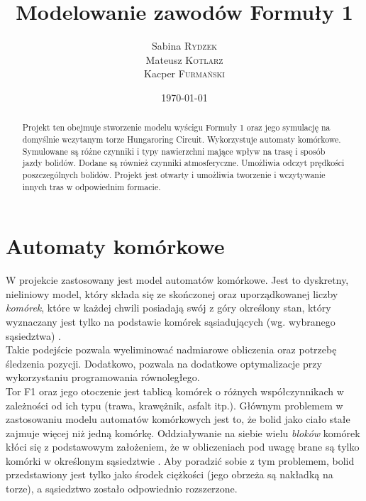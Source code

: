 \documentclass{article}
\title{Modelowanie zawodów Formuły 1} %
\author{Sabina \textsc{Rydzek} \\ Mateusz \textsc{Kotlarz} \\ Kacper \textsc{Furmański}} %
\date{\today} %
\begin{document}
\maketitle %


\begin{abstract}
Projekt ten obejmuje stworzenie modelu wyścigu Formuły 1 oraz jego symulację na domyślnie wczytanym torze Hungaroring Circuit. Wykorzystuje automaty komórkowe. Symulowane są różne czynniki i typy nawierzchni mające wpływ na trasę i sposób jazdy bolidów. Dodane są również czynniki atmosferyczne. Umożliwia odczyt prędkości poszczególnych bolidów. Projekt jest otwarty i umożliwia tworzenie i wczytywanie innych tras w odpowiednim formacie.
\end{abstract}


\section{Automaty komórkowe}

W projekcie zastosowany jest model automatów komórkowe. Jest to dyskretny, nieliniowy model, który składa się ze skończonej oraz uporządkowanej liczby \textit{komórek}, które w każdej chwili posiadają swój z góry określony stan, który wyznaczany jest tylko na podstawie komórek sąsiadujących (wg. wybranego sąsiedztwa) \cite{cellularAutomata}. \\

Takie podejście pozwala wyeliminować nadmiarowe obliczenia oraz potrzebę śledzenia pozycji. Dodatkowo, pozwala na dodatkowe optymalizacje przy wykorzystaniu programowania równoległego. \\

Tor F1 oraz jego otoczenie jest tablicą komórek o różnych współczynnikach w zależności od ich typu (trawa, krawężnik, asfalt itp.). Głównym problemem w zastosowaniu modelu automatów komórkowych jest to, że bolid jako ciało stałe zajmuje więcej niż jedną komórkę. Oddziaływanie na siebie wielu \textit{bloków} komórek kłóci się z podstawowym założeniem, że w obliczeniach pod uwagę brane są tylko komórki w określonym sąsiedztwie \cite{particleSimulation}. Aby poradzić sobie z tym problemem, bolid przedstawiony jest tylko jako środek ciężkości (jego obrzeża są nakładką na torze), a sąsiedztwo zostało odpowiednio rozszerzone.
\end{document}
